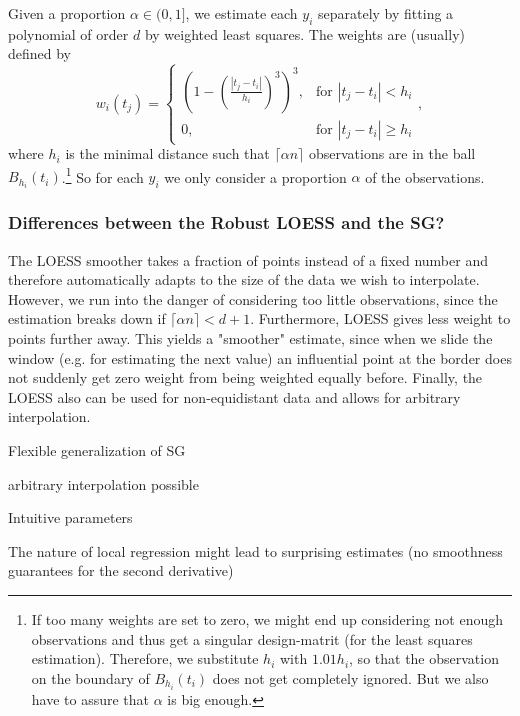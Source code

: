 		Given a proportion $\alpha \in (0,1]$, we estimate each $y_i$ separately by fitting a polynomial of order $d$ by weighted least squares. The weights are (usually) defined by
		$$w_i(t_j)=\begin{cases}
				\left(1-\left(\frac{|t_j-t_i|}{h_i}\right)^{3}\right)^{3}, & \text{for } |t_j-t_i|<h_i           \\
				0,                                                   & \text{for } |t_j-t_i| \geqslant h_i
			\end{cases} ,$$
		where $h_i$ is the minimal distance such that $\lceil \alpha n\rceil$ observations are in the ball $B_{h_i}(t_i)$.\footnote{\label{footnote:LOESS}If too many weights are set to zero, we might end up considering not enough observations and thus get a singular design-matrit (for the least squares estimation). Therefore, we substitute $h_i$ with $1.01 h_i$, so that the observation on the boundary of $B_{h_i}(t_i)$ does not get completely ignored. But we also have to assure that $\alpha$ is big enough.} So for each $y_i$ we only consider a proportion $\alpha$ of the observations.

		\subsubsection{Differences between the Robust LOESS and the SG?}
		The LOESS smoother takes a fraction of points instead of a fixed number and therefore automatically adapts to the size of the data we wish to interpolate. However, we run into the danger of considering too little observations, since the estimation breaks down if $\lceil \alpha n\rceil < d+1$.
		Furthermore, LOESS gives less weight to points further away. This yields a "smoother" estimate, since when we slide the window (e.g. for estimating the next value) an influential point at the border does not suddenly get zero weight from being weighted equally before.
		Finally, the LOESS also can be used for non-equidistant data and allows for arbitrary interpolation.

		\begin{my_pros_cons_table}{
				\item Flexible generalization of SG
				\item arbitrary interpolation possible
				\item Intuitive parameters
			}{
				\item The nature of local regression might lead to surprising estimates (no smoothness guarantees for the second derivative)
			}
		\end{my_pros_cons_table}


